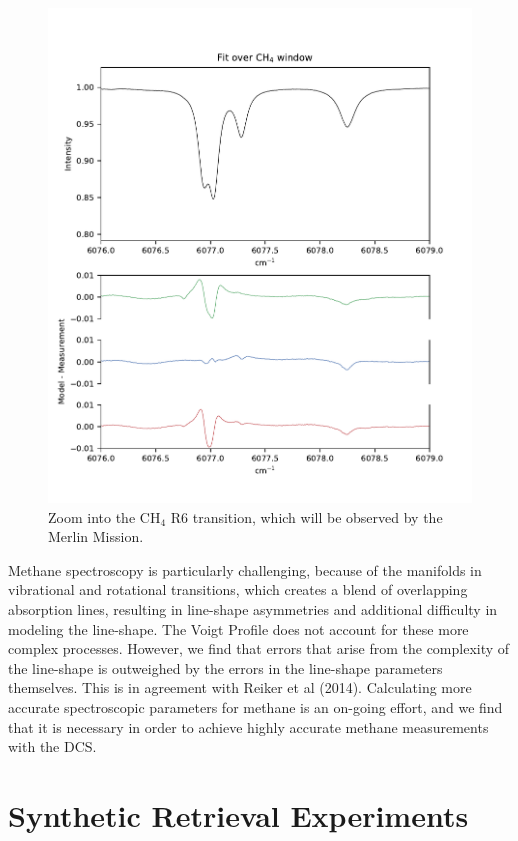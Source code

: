 \documentclass[amt, manuscript]{copernicus}
\begin{document}
\begin{figure}
  \centering
  \includegraphics{ch4_fit_R6.pdf}
  \caption{Zoom into the CH$_4$ R6 transition, which will be observed by the Merlin Mission. }
  \label{fig:ch4_spectrum_r6}
\end{figure}
Methane spectroscopy is particularly challenging, because of the manifolds in vibrational and rotational transitions, which creates a blend of overlapping absorption lines, resulting in line-shape asymmetries and additional difficulty in modeling the line-shape. The Voigt Profile does not account for these more complex processes. However, we find that errors that arise from the complexity of the line-shape is outweighed by the errors in the line-shape parameters themselves. This is in agreement with Reiker et al (2014). Calculating more accurate spectroscopic parameters for methane is an on-going effort, and we find that it is necessary in order to achieve highly accurate methane measurements with the DCS.

\section{Synthetic Retrieval Experiments}
\end{document}
